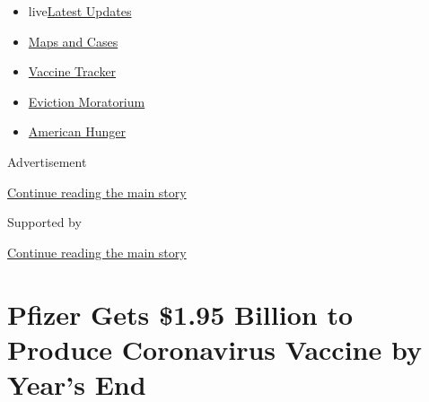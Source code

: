 \begin{itemize}
\tightlist
\item
  live\href{https://www.nytimes3xbfgragh.onion/2020/09/05/world/coronavirus-covid.html?name=styln-coronavirus-national\&region=TOP_BANNER\&block=storyline_menu_recirc\&action=click\&pgtype=Article\&impression_id=1a28d2e1-efba-11ea-8539-d55bbc3b7401\&variant=undefined}{Latest
  Updates}
\item
  \href{https://www.nytimes3xbfgragh.onion/interactive/2020/us/coronavirus-us-cases.html?name=styln-coronavirus-national\&region=TOP_BANNER\&block=storyline_menu_recirc\&action=click\&pgtype=Article\&impression_id=1a28f9f0-efba-11ea-8539-d55bbc3b7401\&variant=undefined}{Maps
  and Cases}
\item
  \href{https://www.nytimes3xbfgragh.onion/interactive/2020/science/coronavirus-vaccine-tracker.html?name=styln-coronavirus-national\&region=TOP_BANNER\&block=storyline_menu_recirc\&action=click\&pgtype=Article\&impression_id=1a28f9f1-efba-11ea-8539-d55bbc3b7401\&variant=undefined}{Vaccine
  Tracker}
\item
  \href{https://www.nytimes3xbfgragh.onion/2020/09/02/your-money/eviction-moratorium-covid.html?name=styln-coronavirus-national\&region=TOP_BANNER\&block=storyline_menu_recirc\&action=click\&pgtype=Article\&impression_id=1a28f9f2-efba-11ea-8539-d55bbc3b7401\&variant=undefined}{Eviction
  Moratorium}
\item
  \href{https://www.nytimes3xbfgragh.onion/interactive/2020/09/02/magazine/food-insecurity-hunger-us.html?name=styln-coronavirus-national\&region=TOP_BANNER\&block=storyline_menu_recirc\&action=click\&pgtype=Article\&impression_id=1a28f9f3-efba-11ea-8539-d55bbc3b7401\&variant=undefined}{American
  Hunger}
\end{itemize}

Advertisement

\protect\hyperlink{after-top}{Continue reading the main story}

Supported by

\protect\hyperlink{after-sponsor}{Continue reading the main story}

\hypertarget{pfizer-gets-195-billion-to-produce-coronavirus-vaccine-by-years-end}{%
\section{Pfizer Gets \$1.95 Billion to Produce Coronavirus Vaccine by
Year's
End}\label{pfizer-gets-195-billion-to-produce-coronavirus-vaccine-by-years-end}}


